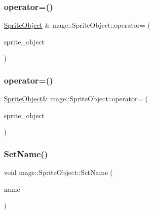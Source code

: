\subsubsection{\texorpdfstring{operator=()}{operator=()}\hspace{0.1cm}{\footnotesize\ttfamily [1/2]}}
{\footnotesize\ttfamily \hyperlink{classmage_1_1_sprite_object}{Sprite\+Object} \& mage\+::\+Sprite\+Object\+::operator= (\begin{DoxyParamCaption}\item[{const \hyperlink{classmage_1_1_sprite_object}{Sprite\+Object} \&}]{sprite\+\_\+object }\end{DoxyParamCaption})}

\hypertarget{classmage_1_1_sprite_object_ab51df65f44159c6d0015894003661452}{}\label{classmage_1_1_sprite_object_ab51df65f44159c6d0015894003661452} 
\subsubsection{\texorpdfstring{operator=()}{operator=()}\hspace{0.1cm}{\footnotesize\ttfamily [2/2]}}
{\footnotesize\ttfamily \hyperlink{classmage_1_1_sprite_object}{Sprite\+Object}\& mage\+::\+Sprite\+Object\+::operator= (\begin{DoxyParamCaption}\item[{\hyperlink{classmage_1_1_sprite_object}{Sprite\+Object} \&\&}]{sprite\+\_\+object }\end{DoxyParamCaption})\hspace{0.3cm}{\ttfamily [default]}}

\hypertarget{classmage_1_1_sprite_object_a784cd7d61f3a9f71a521656ae3199366}{}\label{classmage_1_1_sprite_object_a784cd7d61f3a9f71a521656ae3199366} 
\subsubsection{\texorpdfstring{Set\+Name()}{SetName()}}
{\footnotesize\ttfamily void mage\+::\+Sprite\+Object\+::\+Set\+Name (\begin{DoxyParamCaption}\item[{const string \&}]{name }\end{DoxyParamCaption})}

